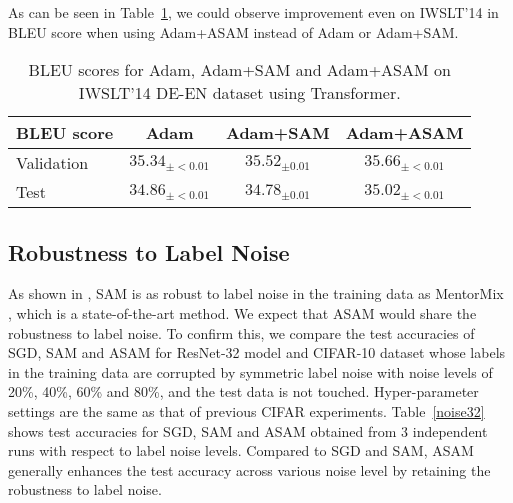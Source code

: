 \documentclass{article}
\begin{document}
As can be seen in Table~\ref{iwslt}, we could observe improvement even on IWSLT'14 in BLEU score when using Adam+ASAM instead of Adam or Adam+SAM.


\begin{table}[h]
\setlength\tabcolsep{4.5pt}
\caption{BLEU scores for Adam, Adam+SAM and Adam+ASAM on IWSLT'14 DE-EN dataset using Transformer. \label{iwslt}}
\begin{center}
\begin{small}
\begin{tabular}{lccc}
\toprule
BLEU score & Adam & Adam+SAM & Adam+ASAM\\
\midrule
Validation & $35.34_{\pm <0.01}$ & $35.52_{\pm 0.01}$ & $\mathbf{35.66}_{\pm <0.01}$\\
Test & $34.86_{\pm <0.01}$ & $34.78_{\pm 0.01}$ & $\mathbf{35.02}_{\pm <0.01}$\\
\bottomrule
\end{tabular}
\end{small}
\end{center}
\end{table}






\subsection{Robustness to Label Noise} \label{robust}

As shown in \citet{foret2021sharpnessaware}, SAM is as robust to label noise in the training data as MentorMix \citep{jiang2020beyond}, which is a state-of-the-art method.  
We expect that ASAM would share the robustness to label noise. To confirm this, we compare the test accuracies of SGD, SAM and ASAM for ResNet-32 model and CIFAR-10 dataset whose labels in the training data are corrupted by symmetric label noise \citep{van2015learning} with noise levels of 20\%, 40\%, 60\% and 80\%, and the test data is not touched. Hyper-parameter settings are the same as that of previous CIFAR experiments.
Table~\ref{noise32} shows test accuracies for SGD, SAM and ASAM obtained from 3 independent runs with respect to label noise levels. Compared to SGD and SAM, ASAM generally enhances the test accuracy across various noise level by retaining the robustness to label noise.
\end{document}
